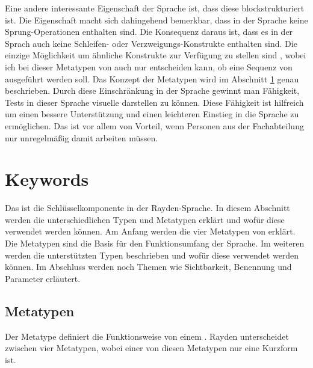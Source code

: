 \SuperPar
Eine andere interessante Eigenschaft der Sprache ist, dass diese blockstrukturiert ist. Die Eigenschaft macht sich dahingehend bemerkbar, dass in der Sprache keine Sprung-Operationen enthalten sind. Die Konsequenz daraus ist, dass es in der Sprach auch keine Schleifen- oder Verzweigungs-Konstrukte enthalten sind. Die einzige Möglichkeit um ähnliche Konstrukte zur Verfügung zu stellen sind , wobei ich bei dieser Metatypen von  auch nur entscheiden kann, ob eine Sequenz von  ausgeführt werden soll. Das Konzept der Metatypen wird im Abschnitt \ref{cha:Keyword} genau beschrieben. Durch diese Einschränkung in der Sprache gewinnt man Fähigkeit, Tests in dieser Sprache visuelle darstellen zu können. Diese Fähigkeit ist hilfreich um einen bessere Unterstützung und einen leichteren Einstieg in die Sprache zu ermöglichen. Das ist vor allem von Vorteil, wenn Personen aus der Fachabteilung nur unregelmäßig damit arbeiten müssen. 


\section{Keywords}
\label{cha:Keyword}

Das  ist die Schlüsselkomponente in der Rayden-Sprache. In diesem Abschnitt werden die unterschiedlichen Typen und Metatypen erklärt und wofür diese verwendet werden können. Am Anfang werden die vier Metatypen von  erklärt. Die Metatypen sind die Basis für den Funktionsumfang der Sprache. Im weiteren werden die unterstützten Typen beschrieben und wofür diese verwendet werden können. Im Abschluss werden noch Themen wie Sichtbarkeit, Benennung und Parameter erläutert.


\subsection{Metatypen}

Der Metatype definiert die Funktionsweise von einem . Rayden unterscheidet zwischen vier Metatypen, wobei einer von diesen Metatypen nur eine Kurzform ist. 


